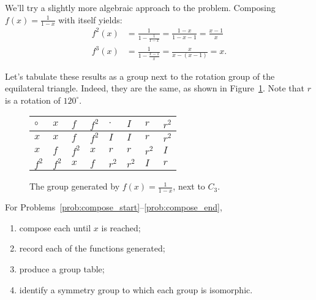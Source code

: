 \documentclass[../gatm.tex]{subfiles}
\begin{document}
\noindent We'll try a slightly more algebraic approach to the problem. Composing $f(x)=\frac{1}{1-x}$ with itself yields:
\begin{align*}
f^2(x)&=\frac{1}{1-\frac{1}{1-x}}=\frac{1-x}{1-x-1}=\frac{x-1}{x} \\
f^3(x)&=\frac{1}{1-\frac{x-1}{x}}=\frac{x}{x-(x-1)}=x.
\end{align*}

\noindent Let's tabulate these results as a group next to the rotation group of the equilateral triangle. Indeed, they are the same, as shown in Figure~\ref{fig:vs_cyclic_3}. Note that $r$ is a rotation of $120^\circ$.

\begin{figure}[h]
	\begin{center}
		\begin{minipage}[b]{\textwidth}
			\centering
			\begin{tabular}{l|lll||l|lll}
				\hline 
				$\circ$  & $x$   & $f$   & $f^2$ & $\cdot$ & $I$   & $r$   & $r^2$ \\ \hline
				\rowcolor{light-gray}
				$x$   & $x$   & $f$   & $f^2$ & $I$   & $I$   & $r$   & $r^2$ \\
				$x$   & $f$   & $f^2$ & $x$   & $r$   & $r$   & $r^2$ & $I$   \\
				\rowcolor{light-gray}
				$f^2$ & $f^2$ & $x$   & $f$   & $r^2$ & $r^2$ & $I$   & $r$   \\ \hline 
			\end{tabular}
			\vspace*{0.5\baselineskip}
		\end{minipage}
	\end{center}
	\vspace*{-2\baselineskip}
	\begin{center}
		\begin{minipage}[t]{\textwidth}
			\caption{The group generated by $f(x)=\frac{1}{1-x}$, next to $C_3$.}
			\label{fig:vs_cyclic_3}
		\end{minipage}
	\end{center}
	\vspace*{-2\baselineskip}
\end{figure}

For Problems~\ref{prob:compose_start}--\ref{prob:compose_end},
\begin{enumerate}[label=\roman*.]
\item compose each until $x$ is reached;
\item record each of the functions generated;
\item produce a group table;
\item identify a symmetry group to which each group is isomorphic.
\end{enumerate}
\end{document}
